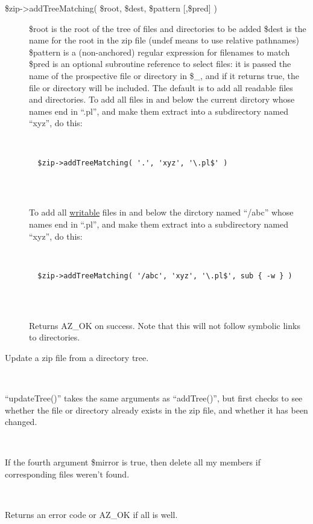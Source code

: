 \documentclass[]{article}
\renewcommand{\emph}[1]{\underline{#1}}
\begin{document}
\begin{description}
\item[\$zip-\textgreater{}addTreeMatching( \$root, \$dest, \$pattern
{[},\$pred{]} )]
\$root is the root of the tree of files and directories to be added
\$dest is the name for the root in the zip file (undef means to use
relative pathnames) \$pattern is a (non-anchored) regular expression for
filenames to match \$pred is an optional subroutine reference to select
files: it is passed the name of the prospective file or directory in
\$\_, and if it returns true, the file or directory will be included.
The default is to add all readable files and directories. To add all
files in and below the current dirctory whose names end in ``.pl'', and
make them extract into a subdirectory named ``xyz'', do this:

~

\begin{verbatim}
  $zip->addTreeMatching( '.', 'xyz', '\.pl$' )
    
\end{verbatim}

~

To add all \emph{writable} files in and below the dirctory named
``/abc'' whose names end in ``.pl'', and make them extract into a
subdirectory named ``xyz'', do this:

~

\begin{verbatim}
  $zip->addTreeMatching( '/abc', 'xyz', '\.pl$', sub { -w } )
    
\end{verbatim}

~

Returns AZ\_OK on success. Note that this will not follow symbolic links
to directories.
\end{description}

\begin{description}
\itemsep1pt\parskip0pt
\item[\$zip-\textgreater{}updateTree( \$root, {[} \$dest, {[} \$pred
{[}, \$mirror{]}{]}{]} );]
Update a zip file from a directory tree.

~

``updateTree()'' takes the same arguments as ``addTree()'', but first
checks to see whether the file or directory already exists in the zip
file, and whether it has been changed.

~

If the fourth argument \$mirror is true, then delete all my members if
corresponding files weren't found.

~

Returns an error code or AZ\_OK if all is well.
\end{description}
\end{document}
